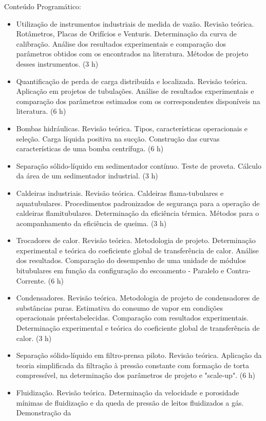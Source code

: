 Conteúdo Programático:
\begin{itemize}
\item  Utilização de instrumentos industriais de medida de vazão. Revisão teórica.
Rotâmetros, Placas de Orifícios e Venturis. Determinação da curva de calibração.
Análise dos resultados experimentais e comparação dos parâmetros obtidos com os
encontrados na literatura. Métodos de projeto desses instrumentos. (3 h)
\item  Quantificação de perda de carga distribuída e localizada. Revisão teórica. Aplicação
em projetos de tubulações. Análise de resultados experimentais e comparação dos
parâmetros estimados com os correspondentes disponíveis na literatura. (6 h)
\item  Bombas hidráulicas. Revisão teórica. Tipos, características operacionais e seleção.
Carga líquida positiva na sucção. Construção das curvas características de uma
bomba centrífuga. (6 h)
\item Separação sólido-líquido em sedimentador contínuo. Teste de proveta. Cálculo da
área de um sedimentador industrial. (3 h)
\item  Caldeiras industriais. Revisão teórica. Caldeiras flama-tubulares e aquatubulares.
Procedimentos padronizados de segurança para a operação de caldeiras
flamitubulares. Determinação da eficiência térmica. Métodos para o acompanhamento
da eficiência de queima. (3 h)
\item  Trocadores de calor. Revisão teórica. Metodologia de projeto. Determinação
experimental e teórica do coeficiente global de transferência de calor. Análise dos
resultados. Comparação do desempenho de uma unidade de módulos bitubulares em
função da configuração do escoamento - Paralelo e Contra-Corrente. (6 h)
\item Condensadores. Revisão teórica. Metodologia de projeto de condensadores de
substâncias puras. Estimativa do consumo de vapor em condições operacionais préestabelecidas. Comparação com resultados experimentais. Determinação
experimental e teórica do coeficiente global de transferência de calor. (3 h)
\item  Separação sólido-líquido em filtro-prensa piloto. Revisão teórica. Aplicação da teoria
simplificada da filtração à pressão constante com formação de torta compressível, na
determinação dos parâmetros de projeto e "scale-up". (6 h)
\item  Fluidização. Revisão teórica. Determinação da velocidade e porosidade mínimas de
fluidização e da queda de pressão de leitos fluidizados a gás. Demonstração da

\end{itemize}
